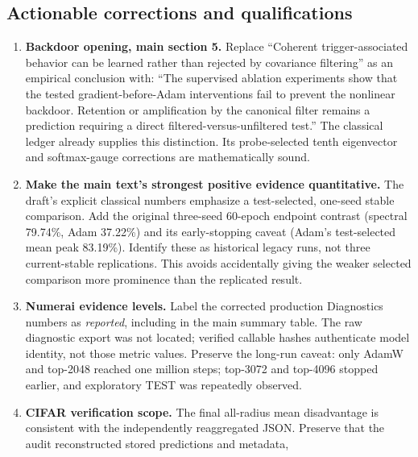 \documentclass[
  british,
  10pt,
  a4paper,
]{article}
\begin{document}
\subsection{Actionable corrections and
qualifications}\label{final-synthesis-audit--actionable-corrections-and-qualifications}

\begin{enumerate}
\def\labelenumi{\arabic{enumi}.}
\item
  \textbf{Backdoor opening, main section 5.} Replace ``Coherent
  trigger-\allowbreak{}associated behavior can be learned rather than
  rejected by covariance filtering'' as an empirical conclusion with:
  ``The supervised ablation experiments show that the tested
  gradient-\allowbreak{}before-\allowbreak{}Adam interventions fail to
  prevent the nonlinear backdoor. Retention or amplification by the
  canonical filter remains a prediction requiring a direct
  filtered-\allowbreak{}versus-\allowbreak{}unfiltered test.'' The
  classical ledger already supplies this distinction.\allowbreak{} Its
  probe-\allowbreak{}selected tenth eigenvector and
  softmax-\allowbreak{}gauge corrections are mathematically sound.
\item
  \textbf{Make the main text's strongest positive evidence
  quantitative\allowbreak{}.\allowbreak{}} The draft's explicit
  classical numbers emphasize a test-\allowbreak{}selected,\allowbreak{}
  one-seed stable comparison.\allowbreak{} Add the original three-seed
  60-epoch endpoint contrast (spectral 79.74\%, Adam 37.22\%) and its
  early-\allowbreak{}stopping caveat (Adam's test-\allowbreak{}selected
  mean peak 83.19\%). Identify these as historical legacy runs, not
  three current-\allowbreak{}stable
  replications\allowbreak{}.\allowbreak{} This avoids accidentally
  giving the weaker selected comparison more prominence than the
  replicated result.
\item
  \textbf{Numerai evidence levels.} Label the corrected production
  Diagnostics numbers as \emph{reported}, including in the main summary
  table. The raw diagnostic export was not located; verified callable
  hashes authenticate model identity, not those metric values. Preserve
  the long-run caveat: only AdamW and top-2048 reached one million
  steps; top-3072 and top-4096 stopped earlier, and exploratory TEST was
  repeatedly observed.
\item
  \textbf{CIFAR verification scope.} The final all-radius mean
  disadvantage is consistent with the independently reaggregated JSON.
  Preserve that the audit reconstructed stored predictions and metadata,

\end{enumerate}
\end{document}
